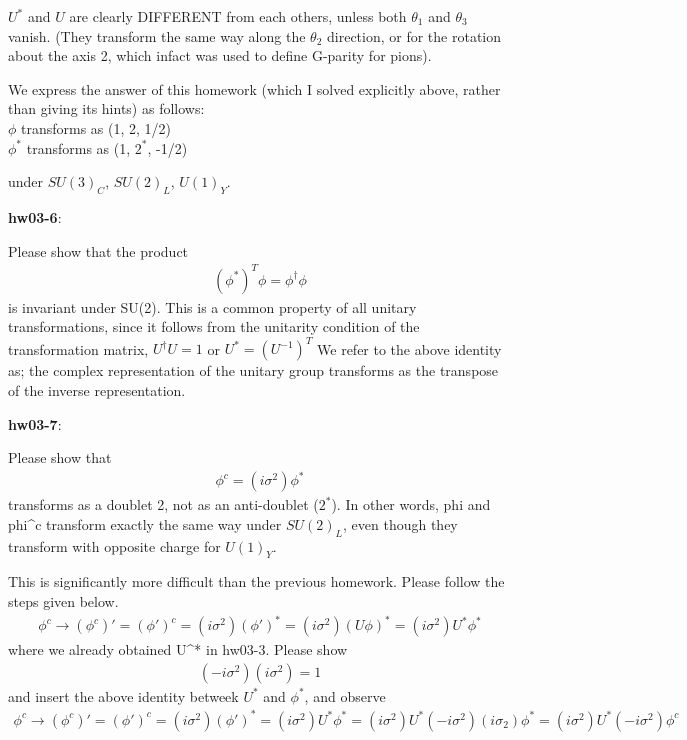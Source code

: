 \documentclass[12pt]{article}
\begin{document}
  $U^*$ and $U$ are clearly DIFFERENT from each others, unless both
  $\theta_1$ and $\theta_3$ vanish.  (They transform the same way along
  the $\theta_2$ direction, or for the rotation about the axis 2,
  which infact was used to define G-parity for pions).

  We express the answer of this homework (which I solved
  explicitly above, rather than giving its hints) as follows:\\

   $\phi$   transforms as (1, 2,    1/2)\\
   $\phi^*$ transforms as (1, $2^*$, -1/2)

  under $SU(3)_C$, $SU(2)_L$, $U(1)_Y$.

{\bf hw03-6}:

  Please show that the product
\begin{eqnarray}
  (\phi^*)^T \phi = \phi^\dagger \phi
\end{eqnarray}
   is invariant under SU(2).  This is a common property of all unitary
  transformations, since it follows from the unitarity condition
  of the transformation matrix,  $U^\dagger U = 1$ or
  $U^* = ( U^{-1} )^T$
  We refer to the above identity as; the complex representation
  of the unitary group transforms as the transpose of the inverse
  representation.

{\bf hw03-7}:

  Please show that
\begin{eqnarray}
  \phi^c = (i\sigma^2) \phi^*
\end{eqnarray}
  transforms as a doublet 2, not as an anti-doublet ($2^*$).
  In other words, phi and phi^c transform exactly the same way under
  $SU(2)_L$, even though they transform with opposite charge for
  $U(1)_Y$.

  This is significantly more difficult than the previous homework.
  Please follow the steps given below.
\begin{eqnarray}
  \phi^c \to (\phi^c)'
  = (\phi')^c
  = (i\sigma^2) (\phi')^*
  = (i\sigma^2) (U \phi)^*
  = (i\sigma^2) U^* \phi^*
\end{eqnarray}
   where we already obtained U^* in hw03-3.  Please show
\begin{eqnarray}
  (-i\sigma^2) (i\sigma^2) = 1
\end{eqnarray}
  and insert the above identity betweek $U^*$ and $\phi^*$,
  and observe
\begin{eqnarray}
  \phi^c \to (\phi^c)'
  = (\phi')^c
  = (i\sigma^2) (\phi')^*
  = (i\sigma^2) U^* \phi^*
  = (i\sigma^2) U^* (-i\sigma^2) (i\sigma_2) \phi^*
  = (i\sigma^2) U^* (-i\sigma^2) \phi^c
\end{eqnarray}
 
\end{document}
